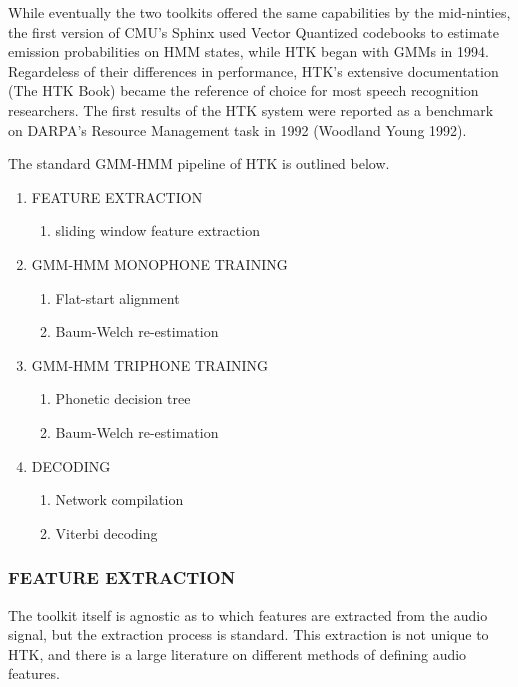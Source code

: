 \documentclass[10pt,a4paper]{article}
\begin{document}
While eventually the two toolkits offered the same capabilities by the mid-ninties, the first version of CMU's Sphinx used Vector Quantized codebooks to estimate emission probabilities on HMM states, while HTK began with GMMs in 1994. Regardeless of their differences in performance, HTK's extensive documentation (The HTK Book) became the reference of choice for most speech recognition researchers. The first results of the HTK system were reported as a benchmark on DARPA's Resource Management task in 1992 (Woodland Young 1992).

The standard GMM-HMM pipeline of HTK is outlined below. 



\begin{enumerate}

\item FEATURE EXTRACTION
  \begin{enumerate}
  \item sliding window feature extraction
  \end{enumerate}

\item GMM-HMM MONOPHONE TRAINING
  \begin{enumerate}
  \item Flat-start alignment
  \item Baum-Welch re-estimation
  \end{enumerate}
  
\item GMM-HMM TRIPHONE TRAINING
  \begin{enumerate}
  \item Phonetic decision tree
  \item Baum-Welch re-estimation
  \end{enumerate}
  
\item DECODING
  \begin{enumerate}
  \item Network compilation
  \item Viterbi decoding
  \end{enumerate}
  
\end{enumerate}




\subsubsection*{FEATURE EXTRACTION}

  The toolkit itself is agnostic as to which features are extracted from the audio signal, but the extraction process is standard. This extraction is not unique to HTK, and there is a large literature on different methods of defining audio features.
  
\end{document}
